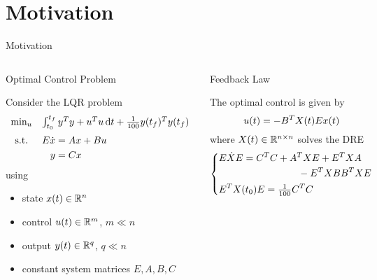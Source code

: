 \section{Motivation}

\begin{frame}{Motivation}
  \begin{columns}[t]
  \begin{block}{\strut Optimal Control Problem}
    Consider the \acf{LQR} problem
    \begin{equation*}
      \begin{array}{cl}
        \min_u & \int_{t_0}^{t_f} y^\T y + u^\T u \dt + \tfrac{1}{100} y(t_f)^\T y(t_f) \medskip\\
        \text{s.t.} & \begin{aligned}[t]
          E \dot x &= Ax + Bu \\
          y &= Cx
        \end{aligned}
      \end{array}
    \end{equation*}
    using
    \begin{itemize}
      \item
        state $x(t)\in\mathbb{R}^n$
      \item
        control $u(t)\in\mathbb{R}^m$, $m\ll n$
      \item
        output $y(t)\in\mathbb{R}^q$, $q\ll n$
      \item
        constant system matrices $E,A,B,C$
    \end{itemize}
  \end{block}
  \pause
  \begin{block}{\strut Feedback Law \parencite[e.g.][]{Locatelli2011}}
    The optimal control is given by
    \begin{equation*}
      u(t) = -
        B^T X(t) E
      x(t)
    \end{equation*}
    where $X(t)\in\mathbb{R}^{n\times n}$ solves the \acf{DRE}
    \begin{equation*}
      \left\{
        \begin{lgathered}
          E\dot X E = \begin{multlined}[t]
            C^\T C + A^\T X E + E^\T X A \\ - E^\T X BB^\T X E
          \end{multlined} \\
          E^\T X(t_0) E = \tfrac{1}{100} C^\T C
        \end{lgathered}
      \right.
    \end{equation*}
  \end{block}
  \end{columns}
\end{frame}

